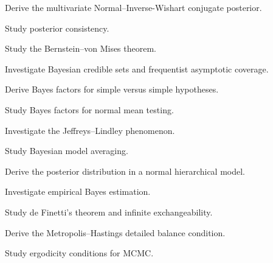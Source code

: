 \begin{exercise}[4]
Derive the multivariate Normal--Inverse-Wishart conjugate posterior.
\end{exercise}

\begin{exercise}[4]
Study posterior consistency.
\end{exercise}

\begin{exercise}[4]
Study the Bernstein--von Mises theorem.
\end{exercise}

\begin{exercise}[4]
Investigate Bayesian credible sets and frequentist asymptotic coverage.
\end{exercise}

\begin{exercise}[4]
Derive Bayes factors for simple versus simple hypotheses.
\end{exercise}

\begin{exercise}[4]
Study Bayes factors for normal mean testing.
\end{exercise}

\begin{exercise}[4]
Investigate the Jeffreys--Lindley phenomenon.
\end{exercise}

\begin{exercise}[4]
Study Bayesian model averaging.
\end{exercise}

\begin{exercise}[4]
Derive the posterior distribution in a normal hierarchical model.
\end{exercise}

\begin{exercise}[4]
Investigate empirical Bayes estimation.
\end{exercise}

\begin{exercise}[4]
Study de Finetti's theorem and infinite exchangeability.
\end{exercise}

\begin{exercise}[4]
Derive the Metropolis--Hastings detailed balance condition.
\end{exercise}

\begin{exercise}[4]
Study ergodicity conditions for MCMC.
\end{exercise}

